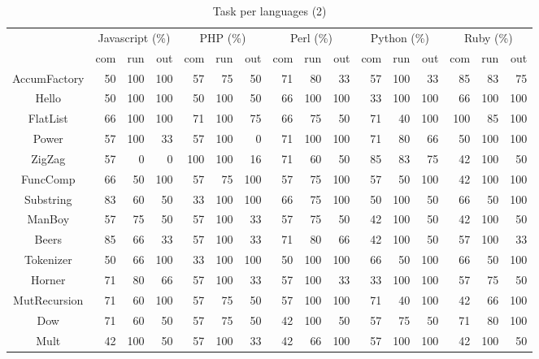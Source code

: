 \documentclass[10pt]{sigplanconf}
\begin{document}
\begin{table*}
\begin{center}
\caption{Task per languages (2)}
\label{tbl:lang-per-task-two}
\begin{tabular}{ c r r r r r r r r r r r r r r r }
\hline
 & \multicolumn{3}{c}{Javascript (\%)} & \multicolumn{3}{c}{PHP (\%)} & \multicolumn{3}{c}{Perl (\%)} & \multicolumn{3}{c}{Python (\%)} & \multicolumn{3}{c}{Ruby (\%)}\\
 & com & run & out & com & run & out & com & run & out & com & run & out & com & run & out \\
\hline
AccumFactory &  50 & 100 & 100 & 57 & 75 & 50 & 71 & 80 & 33 & 57 & 100 & 33 & 85 & 83 & 75 \\
Hello &  50 & 100 & 100 & 50 & 100 & 50 & 66 & 100 & 100 & 33 & 100 & 100 & 66 & 100 & 100 \\
FlatList &  66 & 100 & 100 & 71 & 100 & 75 & 66 & 75 & 50 & 71 & 40 & 100 & 100 & 85 & 100 \\
Power &  57 & 100 & 33 & 57 & 100 & 0 & 71 & 100 & 100 & 71 & 80 & 66 & 50 & 100 & 100 \\
ZigZag &  57 & 0 & 0 & 100 & 100 & 16 & 71 & 60 & 50 & 85 & 83 & 75 & 42 & 100 & 50 \\
FuncComp &  66 & 50 & 100 & 57 & 75 & 100 & 57 & 75 & 100 & 57 & 50 & 100 & 42 & 100 & 100 \\
Substring &  83 & 60 & 50 & 33 & 100 & 100 & 66 & 75 & 100 & 50 & 100 & 50 & 66 & 50 & 100 \\
ManBoy &  57 & 75 & 50 & 57 & 100 & 33 & 57 & 75 & 50 & 42 & 100 & 50 & 42 & 100 & 50 \\
Beers &  85 & 66 & 33 & 57 & 100 & 33 & 71 & 80 & 66 & 42 & 100 & 50 & 57 & 100 & 33 \\
Tokenizer &  50 & 66 & 100 & 33 & 100 & 100 & 50 & 100 & 100 & 66 & 50 & 100 & 66 & 50 & 100 \\
Horner &  71 & 80 & 66 & 57 & 100 & 33 & 57 & 100 & 33 & 33 & 100 & 100 & 57 & 75 & 50 \\
MutRecursion &  71 & 60 & 100 & 57 & 75 & 50 & 57 & 100 & 100 & 71 & 40 & 100 & 42 & 66 & 100 \\
Dow &  71 & 60 & 50 & 57 & 75 & 50 & 42 & 100 & 50 & 57 & 75 & 50 & 71 & 80 & 100 \\
Mult &  42 & 100 & 50 & 57 & 100 & 33 & 42 & 66 & 100 & 57 & 100 & 100 & 42 & 100 & 50 \\
\hline
\end{tabular}
\end{center}
\end{table*}
\end{document}
